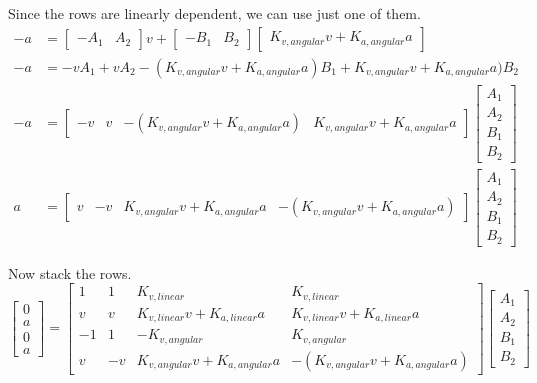 Since the rows are linearly dependent, we can use just one of them.
\begin{align*}
  -a &=
    \begin{bmatrix}
      -A_1 & A_2
    \end{bmatrix} v +
    \begin{bmatrix}
      -B_1 & B_2
    \end{bmatrix}
    \begin{bmatrix}
      K_{v,angular} v + K_{a,angular} a
    \end{bmatrix} \\
  -a &= -v A_1 + v A_2 - (K_{v,angular} v + K_{a,angular} a) B_1 + K_{v,angular} v + K_{a,angular} a) B_2 \\
  -a &=
    \begin{bmatrix}
      -v & v & -(K_{v,angular} v + K_{a,angular} a) & K_{v,angular} v+ K_{a,angular} a
    \end{bmatrix}
    \begin{bmatrix}
      A_1 \\
      A_2 \\
      B_1 \\
      B_2
    \end{bmatrix} \\
  a &=
    \begin{bmatrix}
      v & -v & K_{v,angular} v + K_{a,angular} a & -(K_{v,angular} v + K_{a,angular} a)
    \end{bmatrix}
    \begin{bmatrix}
      A_1 \\
      A_2 \\
      B_1 \\
      B_2
    \end{bmatrix}
\end{align*}

Now stack the rows.
\begin{equation*}
  \begin{bmatrix}
    0 \\
    a \\
    0 \\
    a
  \end{bmatrix} =
  \begin{bmatrix}
    1 & 1 & K_{v,linear} & K_{v,linear} \\
    v & v & K_{v,linear} v + K_{a,linear} a & K_{v,linear} v + K_{a,linear} a \\
    -1 & 1 & -K_{v,angular} & K_{v,angular} \\
    v & -v & K_{v,angular} v + K_{a,angular} a & -(K_{v,angular} v + K_{a,angular} a)
  \end{bmatrix}
  \begin{bmatrix}
    A_1 \\
    A_2 \\
    B_1 \\
    B_2
  \end{bmatrix}
\end{equation*}

